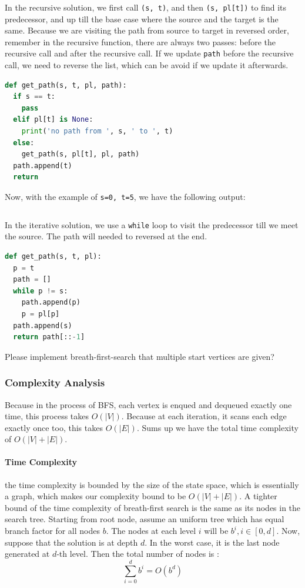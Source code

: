 \documentclass[main.tex]{subfiles}
\begin{document}
In the recursive solution, we first call \texttt{(s, t)}, and then \texttt{(s, pl[t])} to find its predecessor, and up till the base case where the source and the target is the same. Because we are visiting the path from source to target in reversed order, remember in the recursive function, there are always two passes: before the recursive call and after the recursive call. If we update \texttt{path} before the recursive call, we need to reverse the list, which can be avoid if we update it afterwards.
\begin{lstlisting}[language=Python]
def get_path(s, t, pl, path):
  if s == t:   
    pass
  elif pl[t] is None:
    print('no path from ', s, ' to ', t)
  else:
    get_path(s, pl[t], pl, path)   
  path.append(t)
  return
\end{lstlisting}
Now, with the example of \texttt{s=0, t=5}, we have the following output:
\begin{lstlisting}[numbers=none]
\end{lstlisting}

In the iterative solution, we use a \texttt{while} loop to visit the predecessor till we meet the source. The path will needed to reversed at the end.
\begin{lstlisting}[language=Python]
def get_path(s, t, pl):
  p = t
  path = []
  while p != s:
    path.append(p)
    p = pl[p]
  path.append(s)
  return path[::-1]
\end{lstlisting}

\begin{bclogo}[couleur = blue!30, arrondi=0.1,logo=\bccrayon,ombre=true]{Please implement breath-first-search that multiple start vertices are given? }
\end{bclogo}

\subsubsection{Complexity Analysis} Because in the process of BFS, each vertex is enqued and dequeued exactly one time, this process takes $O(|V|)$. Because at each iteration, it scans each edge exactly once too, this takes $O(|E|)$. Sums up we have the total time complexity of $O(|V|+|E|)$.

\paragraph{Time Complexity} the time complexity is bounded by the size of the state space, which is essentially a graph, which makes our complexity bound to be $O(|V|+|E|)$. A tighter bound of the time complexity of breath-first search is the same as its nodes in the search tree. Starting from root node, assume an uniform tree which has equal branch factor for all nodes $b$. The nodes at each level $i$ will be $b^i, i\in[0, d]$. Now, suppose that the solution is at depth $d$. In the worst case, it is the last node generated at $d$-th level. Then the total number of nodes is :
\begin{equation}
    \sum_{i=0}^{d} b^i = O(b^d)
\end{equation}
\end{document}
